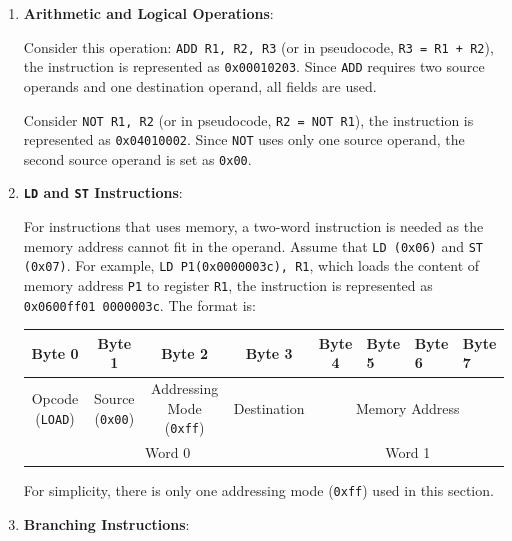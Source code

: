 \begin{enumerate}

\item \textbf{Arithmetic and Logical Operations}:

Consider this operation: \texttt{ADD R1, R2, R3} (or in pseudocode, \texttt{R3 = R1 + R2}),
the instruction is represented as \texttt{0x00010203}. Since \texttt{ADD} requires two source
operands and one destination operand, all fields are used.

Consider \texttt{NOT R1, R2} (or in pseudocode, \texttt{R2 = NOT R1}), the instruction is
represented as \texttt{0x04010002}. Since \texttt{NOT} uses only one source operand, the
second source operand is set as \texttt{0x00}.

\item \textbf{\texttt{LD} and \texttt{ST} Instructions}:

For instructions that uses memory, a two-word instruction is needed as the memory address
cannot fit in the operand. Assume that \texttt{LD (0x06)} and \texttt{ST (0x07)}.
For example, \texttt{LD P1(0x0000003c), R1}, which loads the content of
memory address \texttt{P1} to register \texttt{R1}, the instruction is represented as
\texttt{0x0600ff01 0000003c}. The format is:
\begin{table}[H]
    \centering
    \begin{tabular}{ccccclll}
    Byte 0                       & Byte 1                                     & Byte 2                                      & Byte 3                                   & Byte 4    & Byte 5    & Byte 6    & Byte 7   \\ \hline
    \multicolumn{1}{|c|}{Opcode (\texttt{LOAD})} & \multicolumn{1}{c|}{Source (\texttt{0x00})} & \multicolumn{1}{c|}{Addressing Mode (\texttt{0xff})} & \multicolumn{1}{c|}{Destination} & \multicolumn{4}{c|}{Memory Address} \\ \hline
    \multicolumn{4}{c}{Word 0}                                                                                                                                         & \multicolumn{4}{c}{Word 1}                  
    \end{tabular}
\end{table}

\begin{remark}
    For simplicity, there is only one addressing mode (\texttt{0xff}) used in this section.
\end{remark}

\item \textbf{Branching Instructions}:


\end{enumerate}
